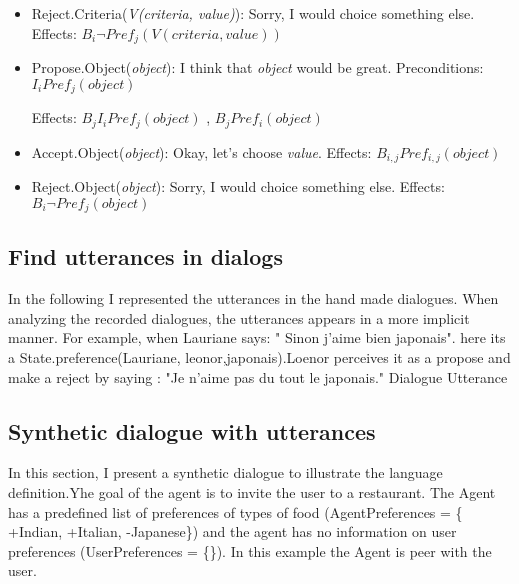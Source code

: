 \documentclass{llncs}
\begin{document}
\begin{itemize}
 \item Reject.Criteria(\textit{V(criteria, value)}): Sorry, I would choice something else.
    \subitem Effects:  $B_{i} \neg  Pref_{j}(V(criteria, value))$
 
  \item Propose.Object(\textit{object}): I think that \textit{object} would be great.
  \subitem Preconditions:  $ I_{i} Pref_{j}(object)$
  
  \subitem Effects:  $B_{j} I_{i} Pref_{j}(object)$ ,  $ B_{j} Pref_{i}(object)$  
  \item Accept.Object(\textit{object}): Okay, let's choose \textit{value}.
     \subitem Effects:  $B_{i,j} Pref_{i,j}(object)$ 
  
  \item Reject.Object(\textit{object}): Sorry, I would choice something else.
      \subitem Effects:  $B_{i} \neg  Pref_{j}(object)$
 \end{itemize} 
 \subsection{Find utterances in dialogs}	
 
 In the following I represented the utterances in the hand made dialogues. When analyzing the recorded dialogues, the utterances appears in a more implicit manner. For example, when Lauriane says: " Sinon j'aime bien japonais". here its a State.preference(Lauriane, leonor,japonais).Loenor perceives it as a propose and make a reject by saying : "Je n'aime pas du tout le japonais."
 Dialogue	Utterance

 \subsection{Synthetic dialogue with utterances}
 In this section, I present a synthetic dialogue to illustrate the language definition.Yhe goal of the agent is to invite the user to a restaurant. The Agent has a predefined list of preferences of types of food (AgentPreferences = \{ +Indian, +Italian, -Japanese\}) and the agent has no information on user preferences (UserPreferences = \{\}). In this example the Agent is peer with the user. 


\begin{minipage}{0.45\textwidth}
 
\end{minipage}%
\hfill
\begin{minipage}{0.45\textwidth}

\end{minipage}%


\noindent 
\vskip 4pt


\end{document}
